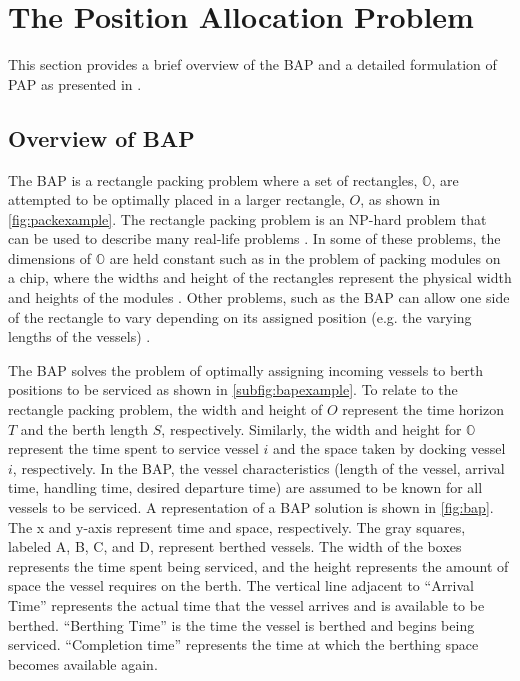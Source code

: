 \documentclass[utf8]{FrontiersinHarvard}
\let\cite\citep                                       %
\begin{document}
\section{The Position Allocation Problem}
\label{sec:the-position-allocation-problem}
This section provides a brief overview of the BAP and a detailed formulation of PAP as presented in
\cite{qarebagh-2019-optim-sched}.

\subsection{Overview of BAP}
\label{sec:overview-of-bap}
The BAP is a rectangle packing problem where a set of rectangles, \(\mathbb{O}\), are attempted to be optimally placed in
a larger rectangle, \(O\), as shown in \autoref{fig:packexample}. The rectangle packing problem is an NP-hard problem that
can be used to describe many real-life problems \cite{bruin-2013-rectan-packin,murata-1995-rectan}. In some of these
problems, the dimensions of \(\mathbb{O}\) are held constant such as in the problem of packing modules on a chip, where
the widths and height of the rectangles represent the physical width and heights of the modules
\cite{murata-1995-rectan}. Other problems, such as the BAP can allow one side of the rectangle to vary depending on its
assigned position (e.g. the varying lengths of the vessels) \cite{buhrkal-2011-model-discr}.

The BAP solves the problem of optimally assigning incoming vessels to berth positions to be serviced as shown in
 \autoref{subfig:bapexample}. To relate to the rectangle packing problem, the width and height of \(O\) represent the time
 horizon \(T\) and the berth length \(S\), respectively. Similarly, the width and height for \(\mathbb{O}\) represent the time
 spent to service vessel \(i\) and the space taken by docking vessel \(i\), respectively. In the BAP, the vessel
 characteristics (length of the vessel, arrival time, handling time, desired departure time) are assumed to be known for
 all vessels to be serviced. A representation of a BAP solution is shown in \autoref{fig:bap}. The x and y-axis
 represent time and space, respectively. The gray squares, labeled A, B, C, and D, represent berthed vessels. The width
 of the boxes represents the time spent being serviced, and the height represents the amount of space the vessel
 requires on the berth. The vertical line adjacent to ``Arrival Time'' represents the actual time that the vessel
 arrives and is available to be berthed. ``Berthing Time'' is the time the vessel is berthed and begins being serviced.
 ``Completion time'' represents the time at which the berthing space becomes available again.
\end{document}
